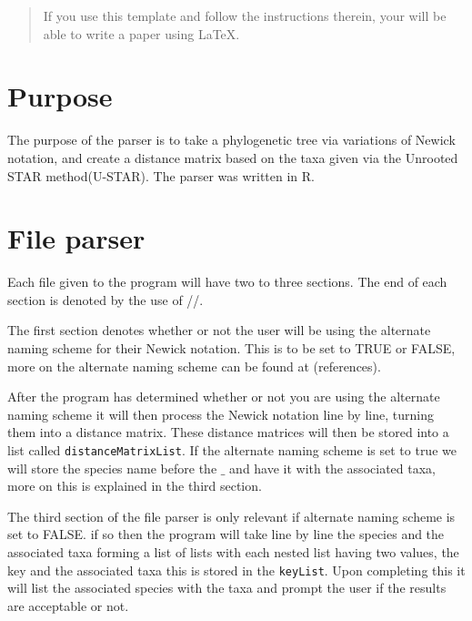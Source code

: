 \documentclass{article}
\begin{document}
\title{}
 
\author{Jesse Zhang}
 

 
\maketitle %
 
\begin{abstract}
If you use this template and follow the instructions therein,
your will be able to write a paper using LaTeX.
\end{abstract}

 
\section{Purpose}

The purpose of the parser is to take a phylogenetic tree via variations of Newick notation, and create a distance matrix based on the taxa given via the Unrooted STAR method(U-STAR). The parser was written in R. 

\section{File parser}
Each file given to the program will have two to three sections. The end of each section is denoted by the use of //.

The first section denotes whether or not the user will be using the alternate naming scheme for their Newick notation. This is to be set to TRUE or FALSE, more on the alternate naming scheme can be found at (references). 

After the program has determined whether or not you are using the alternate naming scheme it will then process the Newick notation line by line, turning them into a distance matrix. These distance matrices will then be stored into a list called {\tt distanceMatrixList}. If the alternate naming scheme is set to true we will store the species name before the $\_$ and have it with the associated taxa, more on this is explained in the third section.  

The third section of the file parser is only relevant if alternate naming scheme is set to FALSE. if so then the program will take line by line the species and the associated taxa forming a list of lists with each nested list having two values, the key and the associated taxa this is stored in the {\tt keyList}. Upon completing this it will list the associated species with the taxa and prompt the user if the results are acceptable or not.
\end{document}
